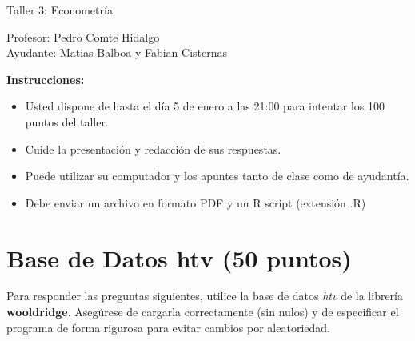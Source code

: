 \documentclass[letterpaper,11pt]{article}
\begin{document}
\begin{center}
    {\Large  Taller 3: Econometría }

Profesor:    Pedro Comte Hidalgo\\
Ayudante: Matias Balboa y Fabian Cisternas
\end{center}

\textbf{Instrucciones:} 

\begin{itemize}
    \item Usted dispone de hasta el día 5 de enero a las 21:00  para intentar los 100 puntos del taller.
    \item Cuide la presentación y redacción de sus respuestas.
    \item Puede utilizar su computador y los apuntes tanto de clase como de ayudantía.
    \item Debe enviar un archivo en formato PDF y un R script (extensión .R)
\end{itemize}

\section{Base de Datos htv (50 puntos)}

Para responder las preguntas siguientes, utilice la base de datos \textit{htv} de la librería \textbf{wooldridge}. Asegúrese de cargarla correctamente (sin nulos) y de especificar el programa de forma rigurosa para evitar cambios por aleatoriedad.
\end{document}
